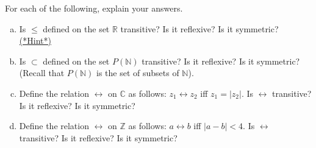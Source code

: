 \begin{exercise}{17}
For each of the following, explain your answers. 
\begin{enumerate}[(a)]
\item Is $\leq$ defined on the set $\mathbb{R}$ transitive? Is it reflexive? Is it symmetric?
\hyperref[secEqRelChapHints]{(*Hint*)}
\item Is $\subset$ defined on the set $P(\mathbb{N})$ transitive? Is it reflexive? Is it symmetric? (Recall that $P(\mathbb{N})$ is the set of subsets of $\mathbb{N}$).
\item Define the relation $\rel$ on $\mathbb{C}$ as follows: $ z_1 \rel z_2$ iff $z_1 = |z_2|$. Is $\rel$ transitive? Is it reflexive? Is it symmetric?
\item Define the relation $\rel$ on $\mathbb{Z}$ as follows: $ a \rel b$ iff $|a - b|< 4$. Is $\rel$ transitive? Is it reflexive? Is it symmetric?
\end{enumerate}
\end{exercise}



